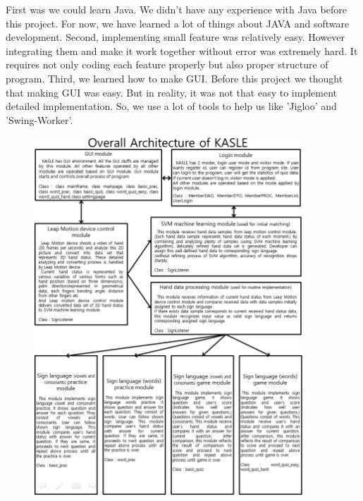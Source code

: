 \documentclass[10pt,journal,compsoc]{IEEEtran}
\begin{document}
First was we could learn Java. We didn’t have any experience with Java before this project. For now, we have learned a lot of things about JAVA and software development.
Second, implementing small feature was relatively easy. However integrating them and make it work together without error was extremely hard. It requires not only coding each feature properly but also proper structure of program.
Third, we learned how to make GUI. Before this project we thought that making GUI was easy. But in reality, it was not that easy to implement detailed implementation. So, we use a lot of tools to help us like 'Jigloo' and 'Swing-Worker'.
\clearpage
\begin{figure}[H]
\includegraphics[width=0.9\textwidth]{My.png}
\caption{}
\end{figure}















\end{document}
